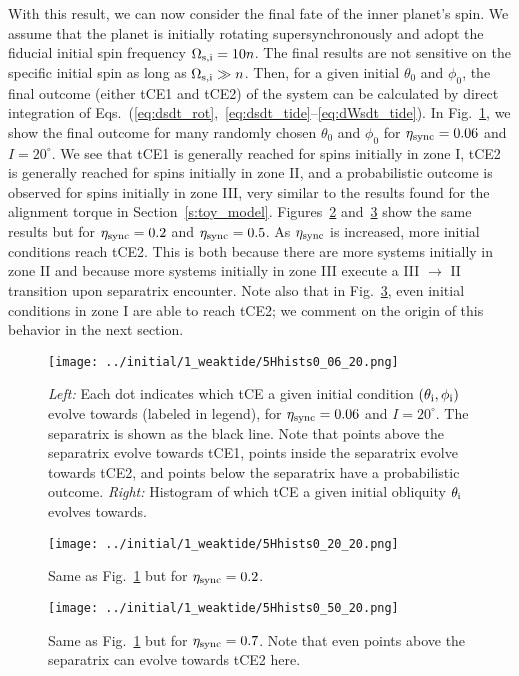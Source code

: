 \documentclass[
        fleqn,
        usenatbib,
    ]{mnras}
\begin{document}
With this result, we can now consider the final fate of the inner planet's spin.
We assume that the planet is initially rotating supersynchronously and adopt the
fiducial initial spin frequency $\Omega_{\rm s, i} = 10n$. The final results are
not sensitive on the specific initial spin as long as $\Omega_{\rm s, i} \gg n$.
Then, for a given initial $\theta_0$ and $\phi_0$, the final outcome (either tCE1 and
tCE2) of the system can be calculated by direct integration of
Eqs.~(\ref{eq:dsdt_rot},~\ref{eq:dsdt_tide}--\ref{eq:dWsdt_tide}). In
Fig.~\ref{fig:Hhists_0_06}, we show the final outcome for many randomly chosen
$\theta_0$ and $\phi_0$ for $\eta_{\rm sync} = 0.06$ and $I = 20^\circ$. We see
that tCE1 is generally reached for spins initially in zone I, tCE2 is generally
reached for spins initially in zone II, and a probabilistic outcome is observed
for spins initially in zone III, very similar to the results found for the
alignment torque in Section~\ref{s:toy_model}. Figures~\ref{fig:Hhists_0_20}
and~\ref{fig:Hhists_0_70} show the same results but for $\eta_{\rm sync} = 0.2$
and $\eta_{\rm sync} = 0.5$. As $\eta_{\rm sync}$ is increased, more initial
conditions reach tCE2. This is both because there are more systems initially in
zone II and because more systems initially in zone III execute a III $\to$ II
transition upon separatrix encounter. Note also that in
Fig.~\ref{fig:Hhists_0_70}, even initial conditions in zone I are able to reach
tCE2; we comment on the origin of this behavior in the next section.
\begin{figure}
    \centering
    \texttt{[image: ../initial/1\_weaktide/5Hhists0\_06\_20.png]}
    \caption{\emph{Left:} Each dot indicates which tCE a given initial condition
    $(\theta_{\rm i}, \phi_{\rm i})$ evolve towards (labeled in legend), for
    $\eta_{\rm sync} = 0.06$ and $I = 20^\circ$. The
    separatrix is shown as the black line. Note that points above the
    separatrix evolve towards tCE1, points inside the separatrix evolve towards
    tCE2, and points below the separatrix have a probabilistic outcome.
    \emph{Right:} Histogram of which tCE a given initial obliquity $\theta_{\rm
    i}$ evolves towards.}\label{fig:Hhists_0_06}
\end{figure}
\begin{figure}
    \centering
    \texttt{[image: ../initial/1\_weaktide/5Hhists0\_20\_20.png]}
    \caption{Same as Fig.~\ref{fig:Hhists_0_06} but for $\eta_{\rm sync} =
    0.2$.}\label{fig:Hhists_0_20}
\end{figure}
\begin{figure}
    \centering
    \texttt{[image: ../initial/1\_weaktide/5Hhists0\_50\_20.png]}
    \caption{Same as Fig.~\ref{fig:Hhists_0_06} but for $\eta_{\rm sync} =
    0.7$. Note that even points above the separatrix can evolve towards tCE2
    here.}\label{fig:Hhists_0_70}
\end{figure}
\end{document}
